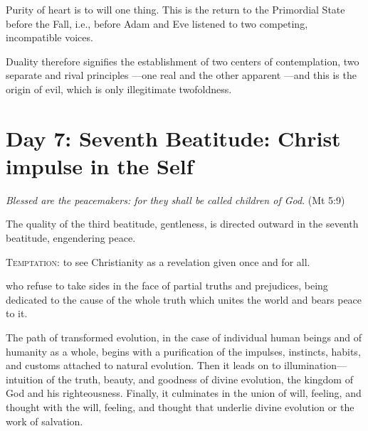 Purity of heart is to will one thing. This is the return to the Primordial State before the Fall, i.e., before Adam and Eve listened to two competing, incompatible voices.

\begin{quotex}
Duality therefore signifies the establishment of two centers of contemplation, two separate and rival principles —one real and the other apparent —and this is the origin of evil, which is only illegitimate twofoldness. 

\end{quotex}

\section{Day 7: Seventh Beatitude: Christ impulse in the Self}

\emph{Blessed are the peacemakers: for they shall be called children of God}. (Mt 5:9)

The quality of the third beatitude, gentleness, is directed outward in the seventh beatitude, engendering peace.

\textsc{Temptation}: to see Christianity as a revelation given once and for all.

\begin{quotex}
 who refuse to take sides in the face of partial truths and prejudices, being dedicated to the cause of the whole truth which unites the world and bears peace to it. 

The path of transformed evolution, in the case of individual human beings and of humanity as a whole, begins with a purification of the impulses, instincts, habits, and customs attached to natural evolution. Then it leads on to illumination—intuition of the truth, beauty, and goodness of divine evolution, the kingdom of God and his righteousness. Finally, it culminates in the union of will, feeling, and thought with the will, feeling, and thought that underlie divine evolution or the work of salvation. 

\end{quotex}

